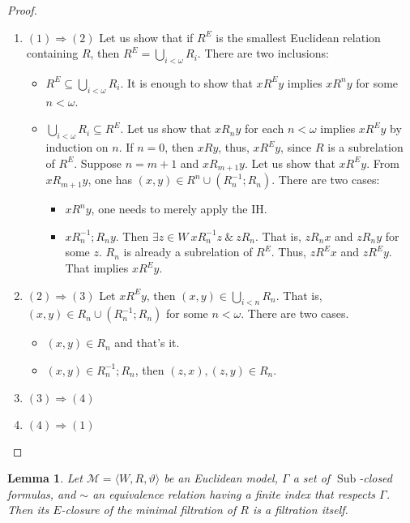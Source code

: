\documentclass[a4paper]{article}
\theoremstyle{defin}
\theoremstyle{theorem}
\theoremstyle{prop}
\theoremstyle{lemma}
\newtheorem{lemma}{Lemma}
\theoremstyle{ex}
\theoremstyle{col}
\begin{document}
\begin{proof}
$ $

\begin{enumerate}
  \item $(1) \Rightarrow (2)$
  Let us show that if $R^{E}$ is the smallest Euclidean relation containing $R$, then $R^{E} = \bigcup \limits_{i < \omega} R_i$. There are two inclusions:
  \begin{itemize}
    \item $R^{E} \subseteq \bigcup \limits_{i < \omega} R_i$. It is enough to show that
    $x R^{E} y$ implies $x R^n y$ for some $n < \omega$.
    \item $\bigcup \limits_{i < \omega} R_i \subseteq R^{E}$.
    Let us show that $x R_n y$ for each $n < \omega$ implies $x R^E y$ by induction on $n$.
    If $n = 0$, then $x R y$, thus, $x R^{E} y$, since $R$ is a subrelation of $R^{E}$.
    Suppose $n = m + 1$ and $x R_{m + 1} y$. Let us show that $x R^{E} y$.
    From $x R_{m + 1} y$, one has $(x, y) \in R^n \cup (R^{-1}_n ; R_n)$. There are two cases:
    \begin{itemize}
      \item $x R^n y$, one needs to merely apply the IH.
      \item $x R^{-1}_n ; R_n y$. Then $\exists z \in W \: x R^{-1}_n z \: \& \: z R_n$. That is,
      $z R_n x$ and $z R_n y$ for some $z$. $R_n$ is already a subrelation of $R^E$. Thus,
      $z R^{E} x$ and $z R^{E} y$. That implies $x R^{E} y$.
    \end{itemize}
  \end{itemize}
  \item $(2) \Rightarrow (3)$
  Let $x R^E y$, then $(x, y) \in \bigcup \limits_{i < n} R_n$. That is, $(x, y) \in R_n \cup (R_n^{-1} ; R_n)$ for some $n < \omega$. There are two cases.
  \begin{itemize}
    \item $(x, y) \in R_n$ and that's it.
    \item $(x, y) \in R_n^{-1} ; R_n$, then $(z, x), (z, y) \in R_n$.
  \end{itemize}
  \item $(3) \Rightarrow (4)$
  \item $(4) \Rightarrow (1)$
\end{enumerate}
\end{proof}

\begin{lemma}
  Let $\mathcal{M} = \langle W, R, \vartheta \rangle$ be an Euclidean model, $\Gamma$ a set of $\operatorname{Sub}$-closed formulas, and $\sim$ an equivalence relation having a finite index that respects $\Gamma$. Then its $E$-closure of the minimal filtration of $R$ is a filtration itself.
\end{lemma}
\end{document}
